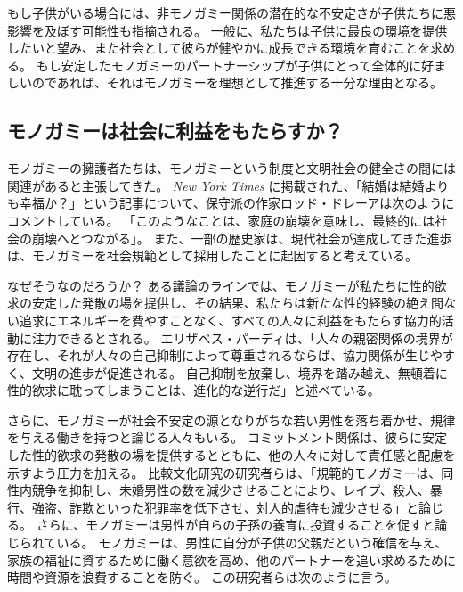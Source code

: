 \documentclass[paper=a4,book,openany]{jlreq}
\begin{document}
もし子供がいる場合には、非モノガミー関係の潜在的な不安定さが子供たちに悪影響を及ぼす可能性も指摘される。
一般に、私たちは子供に最良の環境を提供したいと望み、また社会として彼らが健やかに成長できる環境を育むことを求める。
もし安定したモノガミーのパートナーシップが子供にとって全体的に好ましいのであれば、それはモノガミーを理想として推進する十分な理由となる。

\subsection{モノガミーは社会に利益をもたらすか？}

モノガミーの擁護者たちは、モノガミーという制度と文明社会の健全さの間には関連があると主張してきた。
\emph{New York Times} に掲載された、「結婚は結婚よりも幸福か？」という記事について、保守派の作家ロッド・ドレーアは次のようにコメントしている。
「このようなことは、家庭の崩壊を意味し、最終的には社会の崩壊へとつながる」\citep{dreher17:_perver_progr}。
また、一部の歴史家は、現代社会が達成してきた進歩は、モノガミーを社会規範として採用したことに起因すると考えている。

なぜそうなのだろうか？ ある議論のラインでは、モノガミーが私たちに性的欲求の安定した発散の場を提供し、その結果、私たちは新たな性的経験の絶え間ない追求にエネルギーを費やすことなく、すべての人々に利益をもたらす協力的活動に注力できるとされる。
エリザベス・パーディは、「人々の親密関係の境界が存在し、それが人々の自己抑制によって尊重されるならば、協力関係が生じやすく、文明の進歩が促進される。
自己抑制を放棄し、境界を踏み越え、無頓着に性的欲求に耽ってしまうことは、進化的な逆行だ」と述べている\citep{pardi19:_no_human_being_arent_happier}。

さらに、モノガミーが社会不安定の源となりがちな若い男性を落ち着かせ、規律を与える働きを持つと論じる人々もいる。
コミットメント関係は、彼らに安定した性的欲求の発散の場を提供するとともに、他の人々に対して責任感と配慮を示すよう圧力を加える。
比較文化研究の研究者らは、「規範的モノガミーは、同性内競争を抑制し、未婚男性の数を減少させることにより、レイプ、殺人、暴行、強盗、詐欺といった犯罪率を低下させ、対人的虐待も減少させる」と論じる\citep[p.657]{henrich12:_puzzl_monog_marriag}。
さらに、モノガミーは男性が自らの子孫の養育に投資することを促すと論じられている。
モノガミーは、男性に自分が子供の父親だという確信を与え、家族の福祉に資するために働く意欲を高め、他のパートナーを追い求めるために時間や資源を浪費することを防ぐ。
この研究者らは次のように言う。
\end{document}
